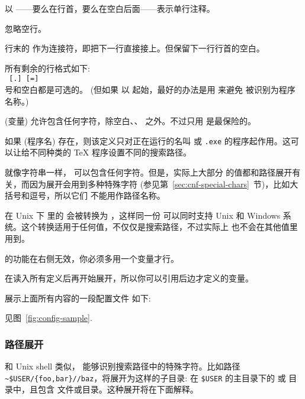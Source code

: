 \documentclass{article}
\begin{document}
\begin{itemize*}
\item
  以 \code{\%}——要么在行首，要么在空白后面——表示单行注释。
\item
  忽略空行。
\item
  行末的 \bs{} 作为连接符，即把下一行直接接上。但保留下一行行首的空白。
\item
  所有剩余的行格式如下: \\
  \hspace*{2em}\texttt{ \textrm{[}.\textrm{]}
  \textrm{[}=\textrm{]} }\\[1pt]
  \samp{=} 号和空白都是可选的。
  (但如果  以  起始，最好的办法是用 \samp{=} 来避免 
  被识别为程序名称。)
\item
   (变量) 允许包含任何字符，除空白、\samp{=}、
  之外。不过只用  是最保险的。
\item
  如果  (程序名) 存在，则该定义只对正在运行的名叫
  \texttt{} 或 \texttt{.exe}
  的程序起作用。这可以让给不同种类的 \TeX{} 程序设置不同的搜索路径。
\item 就像字符串一样， 可以包含任何字符。但是，实际上大部分
   的值都和路径展开有关，而因为展开会用到多种特殊字符
  (参见第~\ref{sec:cnf-special-chars}~节)，比如大括号和逗号，所以它们
  不能用作路径名称。

  在 Unix 下  里的 \samp{;} 会被转换为 \samp{:}，这样同一份
   可以同时支持 Unix 和 Windows
  系统。这个转换适用于任何值，不仅仅是搜索路径，不过实际上 \samp{;}
  也不会在其他值里用到。

   的功能在右侧无效，你必须多用一个变量才行。
\item
  在读入所有定义后再开始展开，所以你可以引用后边才定义的变量。
\end{itemize*}
展示上面所有内容的一段配置文件
\ifSingleColumn
如下:


\else
见图~\ref{fig:config-sample}.
\fi

\subsubsection{路径展开}
\label{sec:path-expansion}

和 Unix shell 类似，\KPS{} 能够识别搜索路径中的特殊字符。比如路径
\verb+~$USER/{foo,bar}//baz+，将展开为这样的子目录: 在 \texttt{\$USER}
的主目录下的  或  目录中，且包含 
文件或目录。这种展开将在下面解释。
\end{document}
